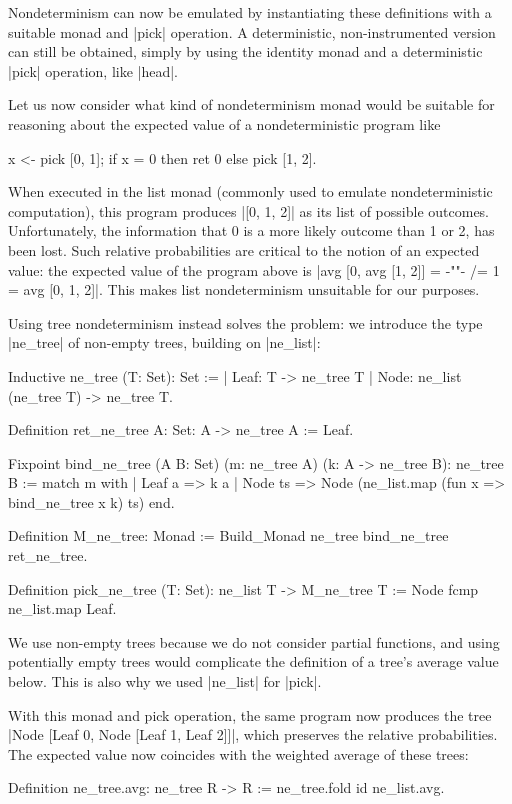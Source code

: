 \documentclass[runningheads]{llncs}
\begin{document}
Nondeterminism can now be emulated by instantiating these definitions with a suitable monad and |pick| operation. A deterministic, non-instrumented version can still be obtained, simply by using the identity monad and a deterministic |pick| operation, like |head|.

Let us now consider what kind of nondeterminism monad would be suitable for reasoning about the expected value of a nondeterministic program like
\begin{code}
  x <- pick [0, 1]; if x = 0 then ret 0 else pick [1, 2].
\end{code}
When executed in the list monad (commonly used to emulate nondeterministic computation), this program
produces |[0, 1, 2]| as its list of possible outcomes. Unfortunately, the information that 0 is a more likely outcome than 1 or 2, has been lost. Such relative probabilities are critical to the notion of an expected value: the expected value of the program above is |avg [0, avg [1, 2]] = {-""-} /= 1 = avg [0, 1, 2]|. This makes list nondeterminism unsuitable for our purposes.

Using tree nondeterminism instead solves the problem: we introduce the type |ne_tree| of non-empty trees, building on |ne_list|: 
\begin{code}
  Inductive ne_tree (T: Set): Set :=
    | Leaf: T -> ne_tree T
    | Node: ne_list (ne_tree T) -> ne_tree T.

  Definition ret_ne_tree {A: Set}: A -> ne_tree A := Leaf.

  Fixpoint bind_ne_tree (A B: Set)
    (m: ne_tree A) (k: A -> ne_tree B): ne_tree B :=
      match m with
      | Leaf a => k a
      | Node ts => Node (ne_list.map (fun x => bind_ne_tree x k) ts)
      end.

  Definition M_ne_tree: Monad := Build_Monad ne_tree bind_ne_tree ret_ne_tree.

  Definition pick_ne_tree (T: Set): ne_list T -> M_ne_tree T
    := Node fcmp ne_list.map Leaf.
\end{code}
We use non-empty trees because we do not consider partial functions, and using potentially empty trees would complicate the definition of a tree's average value below. This is also why we used |ne_list| for |pick|.

With this monad and pick operation, the same program now produces the tree |Node [Leaf 0, Node [Leaf 1, Leaf 2]]|, which preserves the relative probabilities. The expected value now coincides with the weighted average of these trees:
\begin{code}
  Definition ne_tree.avg: ne_tree R -> R := ne_tree.fold id ne_list.avg.
\end{code}
\end{document}
